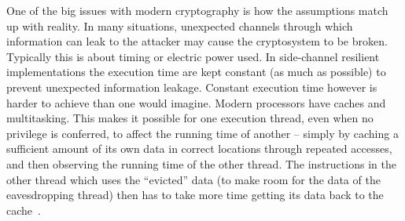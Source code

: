 
One of the big issues with modern cryptography is how the assumptions
match up with reality. In many situations, unexpected channels
through which information can leak to the attacker may cause the
cryptosystem to be broken. Typically this is about timing or
electric power used. 
In side-channel resilient implementations the execution time
are kept constant (as much as possible) to prevent unexpected
information leakage.
Constant execution time however is harder to achieve than one would imagine.
Modern processors have caches 
and multitasking. This makes it possible for one execution
thread, even when no privilege is conferred, to affect the running
time of another -- simply by caching a sufficient amount of its own
data in correct locations through repeated accesses, and then
observing the running time of the other thread. The instructions in
the other thread which uses the ``evicted'' data (to make room for the
data of the eavesdropping thread) then has to take more time getting
its data back to the cache~\cite{B:05:CTAA}. 



